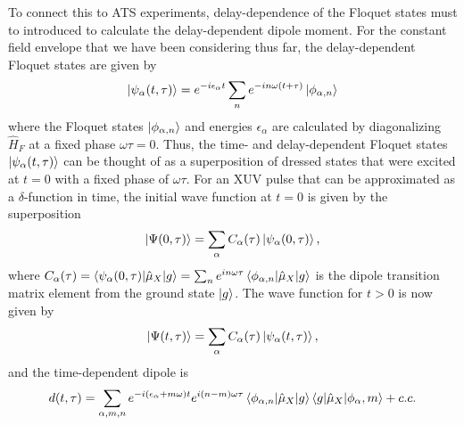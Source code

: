 To connect this to ATS experiments, delay-dependence  of the Floquet states must to introduced to calculate the delay-dependent dipole moment.  For the constant field envelope that we have been considering thus far, the delay-dependent Floquet states are given by
\begin{equation}
	\ket{\psi_\alpha(t,\tau)}=e^{-i\epsilon_\alpha t}\sum_{n}e^{-i n\omega(t+\tau)}\ket{\phi_{\alpha,n}}
\end{equation}
where the Floquet states $\ket{\phi_{\alpha,n}}$ and energies $\epsilon_\alpha$ are calculated by diagonalizing $\hat{H}_F$ at a fixed phase $\omega\tau=0$.  Thus, the time- and delay-dependent Floquet states $\ket{\psi_\alpha(t,\tau)}$ can be thought of as a superposition of dressed states that were excited at $t=0$ with a fixed phase of $\omega\tau$.  For an XUV pulse that can be approximated as a $\delta$-function in time, the initial wave function at $t=0$ is given by the superposition
\begin{equation}
	\ket{\Psi(0,\tau)}=\sum_{\alpha}C_{\alpha}(\tau)\ket{\psi_{\alpha}(0,\tau)},
\end{equation}
where $C_\alpha(\tau)=\braket{\psi_\alpha(0,\tau)|\hat{\mu}_X|g} = \sum_n e^{in\omega\tau}\braket{\phi_{\alpha,n}|\hat{\mu}_X|g}$ is the dipole transition matrix element from the ground state $\ket{g}$.  The wave function for $t>0$ is now given by
\begin{equation}
	\ket{\Psi(t,\tau)}=\sum_\alpha C_{\alpha}(\tau)\ket{\psi_{\alpha}(t,\tau)},
\end{equation}
and the time-dependent dipole is
\begin{equation}
\label{eqn:Floquet_dipole}
	d(t,\tau) =\sum_{\alpha,m,n}e^{-i(\epsilon_\alpha+m\omega)t}e^{i(n-m)\omega\tau} \braket{\phi_{\alpha,n}|\hat{\mu}_X|g} \braket{g|\hat{\mu}_X|\phi_\alpha,m} + c.c.
\end{equation}
